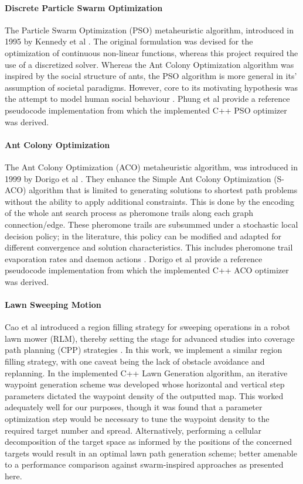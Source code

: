 \documentclass{report}
\begin{document}
\paragraph{Discrete Particle Swarm Optimization}
The Particle Swarm Optimization (PSO) metaheuristic algorithm, introduced in 1995 by Kennedy et al \cite{Kennedy1995}. The original formulation was devised for the optimization of continuous non-linear functions, whereas this project required the use of a discretized solver. Whereas the Ant Colony Optimization algorithm was inspired by the social structure of ants, the PSO algorithm is more general in its' assumption of societal paradigms. However, core to its motivating hypothesis was the attempt to model human social behaviour \cite{Kennedy1995}. Phung et al \cite{Phung2017} provide a reference pseudocode implementation from which the implemented C++ PSO optimizer was derived.

\paragraph{Ant Colony Optimization}
The Ant Colony Optimization (ACO) metaheuristic algorithm, was introduced in 1999 by Dorigo et al \cite{Dorigo1999}. They enhance the Simple Ant Colony Optimization (S-ACO) algorithm that is limited to generating solutions to shortest path problems without the ability to apply additional constraints. This is done by the encoding of the whole ant search process as pheromone trails along each graph connection/edge. These pheromone trails are subsummed under a stochastic local decision policy; in the literature, this policy can be modified and adapted for different convergence and solution characteristics. This includes pheromone trail evaporation rates and daemon actions \cite{Dorigo1999}. Dorigo et al \cite{Dorigo1999} provide a reference pseudocode implementation from which the implemented C++ ACO optimizer was derived.


\paragraph{Lawn Sweeping Motion}
Cao et al \cite{Cao1988} introduced a region filling strategy for sweeping operations in a robot lawn mower (RLM), thereby setting the stage for advanced studies into coverage path planning (CPP) strategies \cite{Galceran2013}. In this work, we implement a similar region filling strategy, with one caveat being the lack of obstacle avoidance and replanning. In the implemented C++ Lawn Generation algorithm, an iterative waypoint generation scheme was developed whose horizontal and vertical step parameters dictated the waypoint density of the outputted map. This worked adequately well for our purposes, though it was found that a parameter optimization step would be necessary to tune the waypoint density to the required target number and spread. Alternatively, performing a cellular decomposition of the target space as informed by the positions of the concerned targets would result in an optimal lawn path generation scheme; better amenable to a performance comparison against swarm-inspired approaches as presented here.
\end{document}
